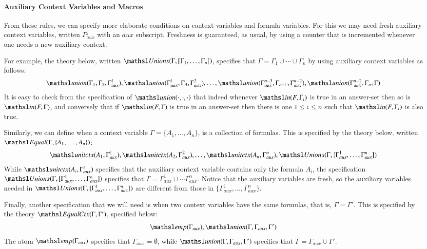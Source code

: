 \documentclass{new_tlp}
\newcommand{\elin}[2]{\ensuremath{{\tsl{unitctx}(\ensuremath{#1}, \ensuremath{#2})}}}
\newcommand{\emp}[1]{\ensuremath{{\tsl{emp}(\ensuremath{#1})}}}
\newcommand{\union}[3]{\ensuremath{{\tsl{union}(\ensuremath{#1},\ensuremath{#2},\ensuremath{ #3})}}}
\newcommand{\In}[2]{\ensuremath{\tsl{in}(\ensuremath{#1},\ensuremath{#2})}}
\newcommand{\unions}[2]{\ensuremath{\tsl{Unions}(\ensuremath{#1},\ensuremath{#2})}}
\newcommand{\equal}[2]{\ensuremath{\tsl{Equal}(\ensuremath{#1},\ensuremath{#2})}}
\newcommand{\equalCtx}[2]{\ensuremath{\tsl{EqualCtx}(\ensuremath{#1},\ensuremath{#2})}}
\begin{document}
\paragraph{Auxiliary Context Variables and Macros}
From these rules, we can specify more elaborate conditions on context   
variables and formula variables. For this we may need fresh auxiliary context variables,
written $\Gamma_{aux}^j$ with an $aux$ subscript. Freshness is guaranteed, as usual, by using a counter 
that is incremented whenever one needs a new auxiliary context.

For example, the theory below, written $\unions{\Gamma}{[\Gamma_1, \ldots, \Gamma_n]}$, 
specifies that $\Gamma = \Gamma_1 \cup \cdots \cup \Gamma_n$ by using auxiliary 
context variables as follows:
\[
 \union{\Gamma_1}{\Gamma_2}{\Gamma_{aux}^1}, \union{\Gamma_{aux}^1}{\Gamma_3}{\Gamma_{aux}^2},
 \ldots, \union{\Gamma_{aux}^{n-3}}{\Gamma_{n-1}}{\Gamma_{aux}^{n-2}}, \union{\Gamma_{aux}^{n-2}}{\Gamma_n}{\Gamma} 
\]
It is easy to check from the specification of $\union{\cdot}{\cdot}{\cdot}$ that indeed 
whenever $\In{F}{\Gamma_i}$ is true in an answer-set then so is $\In{F}{\Gamma}$, and 
conversely that if $\In{F}{\Gamma}$ is true in an answer-set then there is one $1 \leq i\leq n$
such that $\In{F}{\Gamma_i}$ is also true.

Similarly, we can define when a context variable $\Gamma = \{A_1, \ldots, A_n\}$, 
is a collection of formulas. This is specified by the theory below, written 
$\equal{\Gamma}{\{A_1, \ldots, A_n\}}$:
\[
 \elin{A_1}{\Gamma_{aux}^1}, \elin{A_2}{\Gamma_{aux}^2}, \ldots, \elin{A_n}{\Gamma_{aux}^n}, 
 \unions{\Gamma}{[\Gamma_{aux}^1, \ldots, \Gamma_{aux}^n]}
\]
While $\elin{A_i}{\Gamma_{aux}^i}$ specifies that the auxiliary context variable 
contains only the formula $A_i$, the specification $\unions{\Gamma}{[\Gamma_{aux}^1, \ldots, \Gamma_{aux}^n]}$
specifies that $\Gamma = \Gamma_{aux}^1 \cup \cdots \Gamma_{aux}^n$. Notice that
the auxiliary variables are fresh, so the auxiliary variables needed in 
$\unions{\Gamma}{[\Gamma_{aux}^1, \ldots, \Gamma_{aux}^n]}$ are different from 
those in $\{\Gamma_{aux}^1, \ldots, \Gamma_{aux}^n\}$.

Finally, another specification that we will need is when two context variables 
have the same formulas, that is, $\Gamma = \Gamma'$. This is specified by the 
theory $\equalCtx{\Gamma}{\Gamma'}$, specified below:
\[
 \emp{\Gamma_{aux}}, \union{\Gamma}{\Gamma_{aux}}{\Gamma'}
\]
The atom $\emp{\Gamma_{aux}}$ specifies that $\Gamma_{aux} = \emptyset$, while  
$\union{\Gamma}{\Gamma_{aux}}{\Gamma'}$ specifies that $\Gamma = \Gamma_{aux} \cup \Gamma'$.
% 
\end{document}
